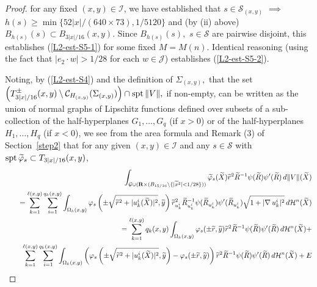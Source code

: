 \documentclass[a4paper,11pt]{amsart}
\begin{document}
\begin{proof}
for any fixed $(x,y) \in {\mathcal I}$, we have established that 
$s \in {\mathcal S}_{(x,y)}$ $\implies$ $h(s) \geq \min\{52|x|/(640\times73), 1/5120\}$ and (by (ii) above) $B_{h(s)}(s) \subset B_{3|x|/16}(x,y).$ Since $B_{h(s)}(s),$ $s \in {\mathcal S}$ are pairwise 
disjoint, this establishes (\ref{L2-est-S5-1}) for some fixed $M = M(n).$ Identical reasoning (using the fact that $|e_{2} \cdot w| > 1/28$ for each $w \in {\mathcal J}$) establishes 
(\ref{L2-est-S5-2}).  

  
 Noting, by (\ref{L2-est-S4}) and the definition of 
$\Sigma_{(x,y)},$ that the set $\left(T_{3|x|/16}^{\pm}(x, y) \setminus {\mathcal C}_{H_{(x,y)}}(\Sigma_{(x,y)})\right) \cap {\rm spt} \, \|V\|,$ if non-empty, can be written as the union of normal graphs of Lipschitz functions defined over subsets of  a sub-collection of the half-hyperplanes $G_{1}, \ldots, G_{q}$ (if $x > 0$) or of the half-hyperplanes $H_{1}, \ldots, H_{q}$ (if $x < 0$), we see from the area formula and Remark (3) of Section~\ref{step2} that for any given $(x,y) \in {\mathcal I}$ and any $s \in {\mathcal S}$ with ${\rm spt} \, \widetilde{\varphi}_{s} \subset T_{3|x|/16}(x,y)$,
\begin{eqnarray}\label{L2-est-S6}
&&\hspace{-.2in}\int_{{\mathcal G} \cup ({\mathbf R} \times (B_{15/16}\setminus \{|\widetilde{x}^{2}| < 1/28\}))}\widetilde{\varphi}_{s}(\widetilde{X})\widetilde{r}^{2}\widetilde{R}^{-1}\psi(\widetilde{R})\psi^{\prime}(\widetilde{R}) \, d\|V\|(\widetilde{X})\nonumber\\
&& =\sum_{k=1}^{\ell(x,y)}\sum_{i=1}^{q_{k}(x,y)}\int_{\Omega_{k}(x,y)} \varphi_{s}\left(\pm\sqrt{\widetilde{r}^{2} + |u_{k}^{i}(\widetilde{X})|^{2}}, \widetilde{y}\right)\widetilde{r}_{u_{k}^{i}}^{2}\widetilde{R}_{u_{k}^{i}}^{-1}\psi(\widetilde{R}_{u_{k}^{i}})\psi^{\prime}(\widetilde{R}_{u_{k}^{i}})
\sqrt{1 + |\nabla \, u_{k}^{i}|^{2}} \, d{\mathcal H}^{n}(\widetilde{X})\nonumber\\
&& =\sum_{k=1}^{\ell(x,y)}q_{k}(x,y)\int_{\Omega_{k}(x,y)}\varphi_{s}(\pm\widetilde{r},\widetilde{y})\widetilde{r}^{2}\widetilde{R}^{-1}\psi(\widetilde{R})\psi^{\prime}(\widetilde{R}) \, d{\mathcal H}^{n}(\widetilde{X}) +\nonumber\\
&&\hspace{.2in}\sum_{k=1}^{\ell(x,y)}\sum_{i=1}^{q_{k}(x,y)}\int_{\Omega_{k}(x,y)} \left(\varphi_{s}\left(\pm\sqrt{\widetilde{r}^{2} + |u_{k}^{i}(\widetilde{X})|^{2}}, \widetilde{y}\right) - \varphi_{s}(\pm\widetilde{r}, 
\widetilde{y})\right) \widetilde{r}^{2}\widetilde{R}^{-1}\psi(\widetilde{R})\psi^{\prime}(\widetilde{R}) \, d{\mathcal H}^{n}(\widetilde{X})  + E

\end{eqnarray}
\end{proof}
\end{document}
